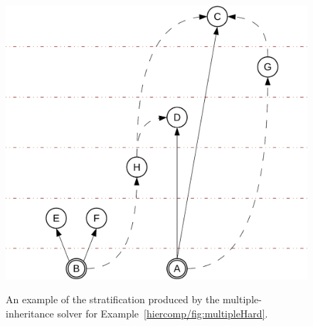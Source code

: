 \begin{figure}[th!b]
\begin{minipage}[b]{0.5\linewidth}
    \includegraphics[scale=0.4]{figures/complementation/steps-5.pdf}
    \label{hiercomp/fig:multiple:steps:5}
  \end{minipage}
  \caption[Stratification Example]{An example of the stratification
    produced by the multiple-inheritance solver for
    Example~\ref{hiercomp/fig:multipleHard}.}
  \label{hiercomp/fig:multiple:steps}
\end{figure}

